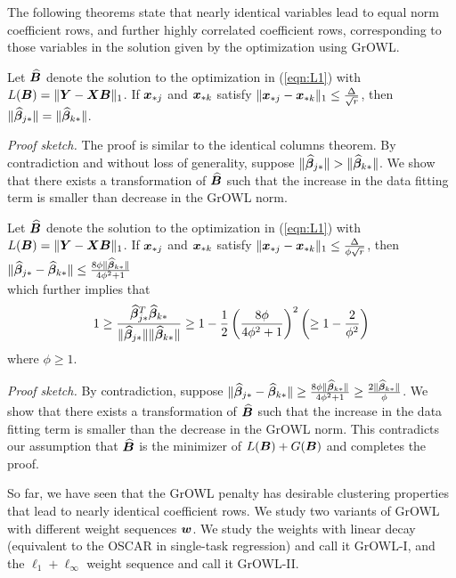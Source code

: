The following theorems state that nearly identical variables lead to equal norm
coefficient rows, and further highly correlated coefficient rows, corresponding
to those variables in the solution given by the optimization using GrOWL.
\begin{theorem}\label{thm2}
Let $\widehat {\boldsymbol{B}}$ denote the solution to the optimization in (\ref{eqn:L1})
with $L(\boldsymbol{B}) = \|\boldsymbol{Y} - \boldsymbol{X} \boldsymbol{B} \|_1$.
If $\boldsymbol{x}_{{\ast} j}$ and $\boldsymbol{x}_{{\ast} k}$ satisfy $\|\boldsymbol{x}_{{\ast} j} - \boldsymbol{x}_{{\ast} k}\|_1 \leq
\frac{\Delta}{\sqrt{r}} $, then
$\|\widehat {\boldsymbol{\beta}}_{j {\ast}}\| = \|\widehat {\boldsymbol{\beta}}_{k {\ast}}\|$.

\end{theorem}
\textit{Proof sketch.}
The proof is similar to the identical columns theorem. By contradiction and
without loss of generality, suppose $\|\widehat {\boldsymbol{\beta}}_{j {\ast}}\| > \|\widehat
{\boldsymbol{\beta}}_{k {\ast}}\|$. We show that there exists a transformation of $\widehat{\boldsymbol{B}}$
such that the increase in the data fitting term is smaller than decrease in the
GrOWL norm.

\begin{theorem}\label{thm3}
Let $\widehat {\boldsymbol{B}}$ denote the solution to the optimization in (\ref{eqn:L1})
with $L(\boldsymbol{B}) = \|\boldsymbol{Y} - \boldsymbol{X} \boldsymbol{B} \|_1$.
If $\boldsymbol{x}_{{\ast} j}$ and $\boldsymbol{x}_{{\ast} k}$ satisfy $\|\boldsymbol{x}_{{\ast} j} - \boldsymbol{x}_{{\ast} k}\|_1 \leq \frac{\Delta}{\phi\sqrt{r}} $, then
$\|\widehat {\boldsymbol{\beta}}_{j {\ast}} - \widehat {\boldsymbol{\beta}}_{k {\ast}}\| \leq \frac{8\phi \|\widehat {\boldsymbol{\beta}}_{k {\ast}}\|}{4\phi^2+1}$ 
\\which further implies that
$$1 \geq \frac{\widehat {\boldsymbol{\beta}}_{j {\ast}}^T \widehat {\boldsymbol{\beta}}_{k {\ast}}}{\|\widehat {\boldsymbol{\beta}}_{j {\ast}}\|\| \widehat {\boldsymbol{\beta}}_{k {\ast}}\|} \geq 1 - \frac{1}{2}\left( \frac{8\phi}{4\phi^2+1}\right)^2     \left( \geq 1 - \frac{2}{\phi^2}\right)$$ where $\phi \geq 1$.
\end{theorem}

\textit{Proof sketch.}
By contradiction, suppose
$\|\widehat {\boldsymbol{\beta}}_{j {\ast}} - \widehat {\boldsymbol{\beta}}_{k {\ast}}\| \geq \frac{8\phi \|\widehat
  {\boldsymbol{\beta}}_{k {\ast}}\|}{4\phi^2+1}  \geq \frac{2 \|\widehat {\boldsymbol{\beta}}_{k {\ast}}\|}{\phi}$.
We show that there exists a transformation of $\widehat{\boldsymbol{B}}$ such that the
increase in the data fitting term is smaller than the decrease in the GrOWL
norm. This contradicts our assumption that $\widehat{\boldsymbol{B}}$ is the minimizer of
$L(\boldsymbol{B}) + G(\boldsymbol{B})$ and completes the proof.

So far, we have seen that the GrOWL penalty has desirable clustering properties
that lead to nearly identical coefficient rows. We study two variants of GrOWL
with different weight sequences $\boldsymbol{w}$. We study the weights with linear decay
(equivalent to the OSCAR in single-task regression) and call it GrOWL-I, and the
$\ell_1 +\ell_{\infty}$ weight sequence and call it GrOWL-II.

